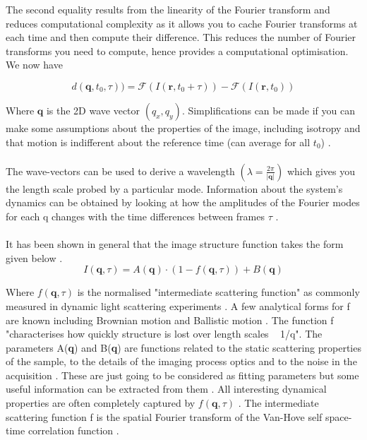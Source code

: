 \documentclass[11pt]{article}
\begin{document}
The second equality results from the linearity of the Fourier transform and reduces computational complexity as it allows you to cache Fourier transforms at each time and then compute their difference.
This reduces the number of Fourier transforms you need to compute, hence provides a computational optimisation.\cite{ddm2}
We now have

\begin{equation}
    d(\textbf{q}, t_0, \tau) ) = \mathscr{F}(I(\mathbf{r}, t_0 + \tau)) - \mathscr{F}(I(\mathbf{r}, t_0))
\end{equation}

Where $\textbf{q}$ is the 2D wave vector $(q_x, q_y)$.
Simplifications can be made if you can make some assumptions about the properties of the image, including isotropy and that motion is indifferent about the reference time (can average for all $t_0$) \cite{ddm1}.
\\\\
The wave-vectors can be used to derive a wavelength $(\lambda = \frac{2\pi}{|\textbf{q}|})$ which gives you the length scale probed by a particular mode.
Information about the system's dynamics can be obtained by looking at how the amplitudes of the Fourier modes for each q changes with the time differences between frames $\tau$ \cite{ddm2}.
\\\\

It has been shown in general that the image structure function takes the form given below \cite{ddm1}.
\begin{equation}
	I(\textbf{q}, \tau) = A(\textbf{q}) \cdot (1 - f(\textbf{q}, \tau)) + B(\textbf{q})
\end{equation}

Where $f(\textbf{q}, \tau)$ is the normalised "intermediate scattering function" as commonly measured in dynamic light scattering experiments \cite{DLSPecora}. A few analytical forms for f are known including Brownian motion and Ballistic motion \cite{DLSPecora}. The function f "characterises how quickly structure is lost over length scales ~ 1/q"\cite{ddm1}. The parameters A(\textbf{q}) and B(\textbf{q}) are functions related to the static scattering properties of the sample, to the details of the imaging process optics and to the noise in the acquisition \cite{ddm1}. These are just going to be considered as fitting parameters but some useful information can be extracted from them \cite{ddm1}. All interesting dynamical properties are often completely captured by $f(\textbf{q}, \tau)$ \cite{ddm1}. The intermediate scattering function f is the spatial Fourier transform of the Van-Hove self space-time correlation function \cite{DLSPecora}.
\end{document}

